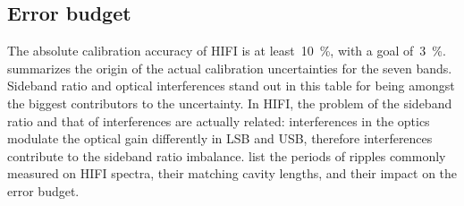 \subsection{Error budget}
\label{sec:error_budget}

The absolute calibration accuracy of HIFI is at least~\SI{10}{\percent}, with a goal of~\SI{3}{\percent}.
 summarizes the origin of the actual calibration uncertainties for the seven bands.
Sideband ratio and optical interferences stand out in this table for being amongst the biggest contributors to the uncertainty.
In HIFI, the problem of the sideband ratio and that of interferences are actually related:
interferences in the optics modulate the optical gain differently in LSB and USB, therefore interferences contribute to the sideband ratio imbalance.
 list the periods of ripples commonly measured on HIFI spectra, their matching cavity lengths, and their impact on the error budget.




